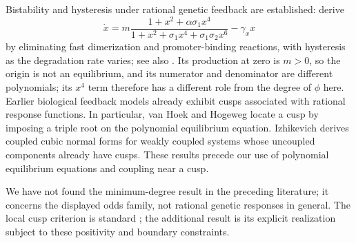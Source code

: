 \begin{enumerate}
Bistability and hysteresis under rational genetic feedback are established:
\cite{Hasty2001} derive
\begin{equation}\label{eq:Hasty}
 \dot x=m\frac{1+x^2+\alpha\sigma_1x^4}{1+x^2+\sigma_1x^4+\sigma_1\sigma_2x^6}-\gamma_xx
\end{equation}
by eliminating fast dimerization and promoter-binding reactions, with hysteresis as the degradation
rate varies; see also \cite{Isaacs2003}. Its production at zero is $m>0$, so the origin is not an equilibrium, and its numerator
and denominator are different polynomials; its $x^4$ term therefore has a different role from
the degree of $\phi$ here.
Earlier biological feedback models already exhibit cusps associated
with rational response functions. In particular, van Hoek and
Hogeweg \cite[Eq.~(21)]{vanHoek} locate a cusp by imposing
a triple root on the polynomial equilibrium equation.
Izhikevich \cite[Theorem~1]{Izhikevich1998} derives coupled cubic
normal forms for weakly coupled systems whose uncoupled components
already have cusps. These results precede our use of polynomial
equilibrium equations and coupling near a cusp.

We have not found the minimum-degree result in the preceding
literature; it concerns the displayed odds family, not rational genetic responses in general. The local cusp criterion is standard \cite{kuznetsov2004};
the additional result is its explicit realization subject to these
positivity and boundary constraints.


\end{enumerate}
